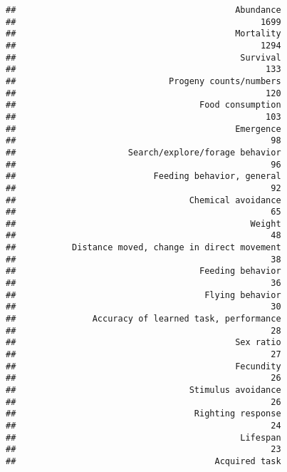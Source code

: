 \documentclass[]{article}
\newenvironment{Shaded}{\begin{snugshade}}{\end{snugshade}}
\newcommand{\CommentTok}[1]{\textcolor[rgb]{0.56,0.35,0.01}{\textit{#1}}}
\newcommand{\KeywordTok}[1]{\textcolor[rgb]{0.13,0.29,0.53}{\textbf{#1}}}
\newcommand{\NormalTok}[1]{#1}
\newcommand{\OperatorTok}[1]{\textcolor[rgb]{0.81,0.36,0.00}{\textbf{#1}}}
\begin{document}
\begin{Shaded}
\end{Shaded}

\begin{verbatim}
##                                           Abundance 
##                                                1699 
##                                           Mortality 
##                                                1294 
##                                            Survival 
##                                                 133 
##                              Progeny counts/numbers 
##                                                 120 
##                                    Food consumption 
##                                                 103 
##                                           Emergence 
##                                                  98 
##                      Search/explore/forage behavior 
##                                                  96 
##                           Feeding behavior, general 
##                                                  92 
##                                  Chemical avoidance 
##                                                  65 
##                                              Weight 
##                                                  48 
##           Distance moved, change in direct movement 
##                                                  38 
##                                    Feeding behavior 
##                                                  36 
##                                     Flying behavior 
##                                                  30 
##               Accuracy of learned task, performance 
##                                                  28 
##                                           Sex ratio 
##                                                  27 
##                                           Fecundity 
##                                                  26 
##                                  Stimulus avoidance 
##                                                  26 
##                                   Righting response 
##                                                  24 
##                                            Lifespan 
##                                                  23 
##                                       Acquired task 

\end{verbatim}
\end{document}
